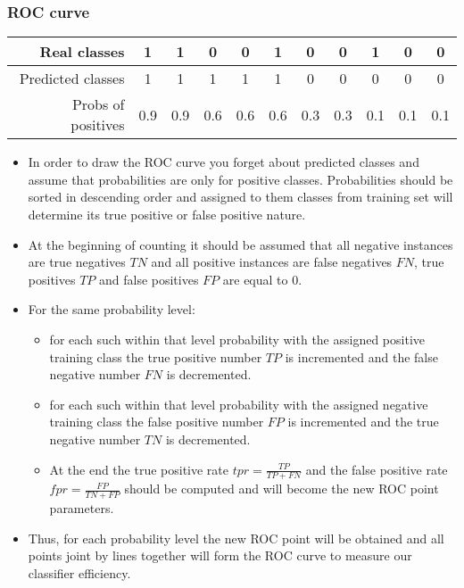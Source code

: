 \documentclass[smaller, proffesionalfonts]{beamer}
\begin{document}
\begin{frame}
\scriptsize
\frametitle{ROC curve}
   \begin{tabular}{||r||c|c|c|c|c|c|c|c|c|c||}
   \hline \hline
   Real classes & 1 & 1 & 0 & 0 & 1 & 0 & 0 & 1 & 0 & 0 \\
   \hline
   Predicted classes & 1 & 1 & 1 & 1 & 1 & 0 & 0 & 0 & 0 & 0 \\
   \hline
   Probs of positives & 0.9 & 0.9 & 0.6 & 0.6 & 0.6 & 0.3 & 0.3 & 0.1 & 0.1 & 0.1 \\
   \hline \hline
   \end{tabular}
\begin{block}{}
\begin{itemize}
\item In order to draw the ROC curve you forget about predicted classes and assume that probabilities are only for positive classes. Probabilities should be sorted in descending order and assigned to them classes from training set will determine its true positive or false positive nature. 
\item 
At the beginning of counting it should be assumed that all negative instances are true negatives $TN$ and all positive instances are false negatives $FN$, true positives $TP$ and false positives $FP$ are equal to $0$.
\item 
For the same probability level: 
\begin{itemize}
\scriptsize
\item
for each such within that level probability with the assigned positive training class the true positive number $TP$ is incremented and the false negative number $FN$ is decremented.
\item
for each such within that level probability with the assigned negative training class the false positive number $FP$ is incremented and the true negative number $TN$ is decremented.
\item 
At the end the true positive rate $tpr=\frac{TP}{TP+FN}$ and the false positive rate $fpr=\frac{FP}{TN+FP}$ should be computed and will become the new ROC point parameters.
\end{itemize}
\item
Thus, for each probability level the new ROC point will be obtained and all points joint by lines together will form the ROC curve to measure our classifier efficiency. 
\end{itemize}
\end{block}
\end{frame}


\end{document}

